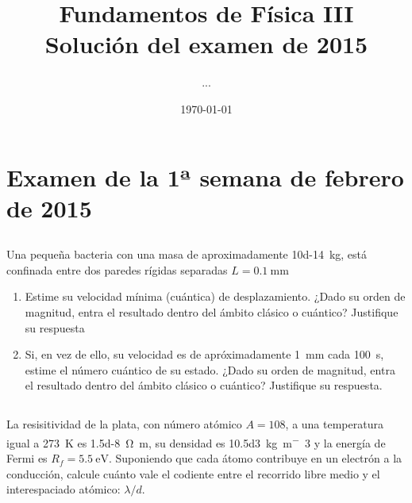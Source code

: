 \documentclass[12pt]{article}
\title{Fundamentos de Física III\\Solución del examen de 2015}
\date{\today}
\author{...}
\begin{document}
    \begin{titlepage}
    \maketitle
    \thispagestyle{empty}
    \hypersetup{pageanchor=true}
    \renewcommand*\contentsname{Contenidos}
    \tableofcontents
    \end{titlepage}



    \newpage

    \section*{Examen de la 1ª semana de febrero de 2015}
        \subsection{} Una pequeña bacteria con una masa de aproximadamente \SI{10d-14}{\kilo\gram},
                está confinada entre dos paredes rígidas separadas $L=\SI{0.1}{\milli\metre}$
        \begin{enumerate}[label=\alph*)]
        \item Estime su velocidad mínima (cuántica) de desplazamiento. ¿Dado su orden de magnitud,
            entra el resultado dentro del ámbito clásico o cuántico? Justifique su respuesta
        \item Si, en vez de ello, su velocidad es de apróximadamente \SI{1}{\milli\metre} cada
            \SI{100}{\second}, estime el número cuántico de su estado. ¿Dado su orden de magnitud,
            entra el resultado dentro del ámbito clásico o cuántico? Justifique su respuesta.
        \end{enumerate}



        \subsection{}
        La resisitividad de la plata, con número atómico $A=\num{108}$, a una temperatura igual
        a \SI{273}{\kelvin} es \SI{1.5d-8}{\ohm\meter}, su densidad es \SI{10.5d3}{\kilo\gram\meter^-3}
        y la energía de Fermi es $R_f = \SI{5.5}{\electronvolt}$. Suponiendo que cada átomo contribuye
        en un electrón a la conducción, calcule cuánto vale el codiente entre el recorrido libre medio
        y el interespaciado atómico: $\lambda/d$.
\end{document}
